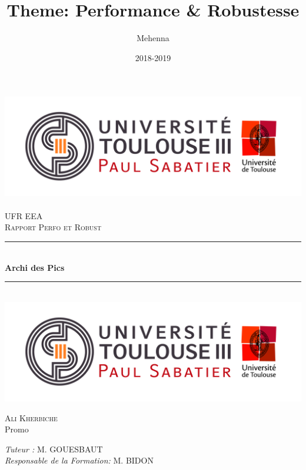 \documentclass[12pt, a4paper, openany]{report}
\title{Theme: Performance & Robustesse}
\author{Mehenna \bsc{Rebout}}
\date{2018-2019}
\newcommand{\HRule}{\rule{\linewidth}{0.5mm}}
\begin{document}

\makeatletter
  \begin{titlepage}
  

  \begin{sffamily}
   \begin{center}

    \includegraphics[scale=0.5]{Logo_UT3.jpg}~\\[1.5cm]

    \textsc{\LARGE UFR EEA }\\[2cm]

    \textsc{\Large Rapport Perfo et Robust}\\[1.5cm]

    \HRule \\[0.4cm]
    { \huge \bfseries Archi des Pics\\[0.4cm] }

    \HRule \\[2cm]
    \includegraphics[scale=0.3]{Logo_UT3.jpg}
    \\[2cm]

    \begin{minipage}{0.4\textwidth}
      \begin{flushleft} \large
         \textsc{Ali Kherbiche}\\
        Promo \\
      \end{flushleft}
    \end{minipage}
    \begin{minipage}{0.4\textwidth}
      \begin{flushright} \large
        \emph{Tuteur :}  \textsc{M. GOUESBAUT}\\
        \emph{Responsable de la Formation:} \textsc{M. BIDON}
      \end{flushright}
    \end{minipage}


\end{center}
\end{sffamily}
\end{titlepage}
\end{document}
